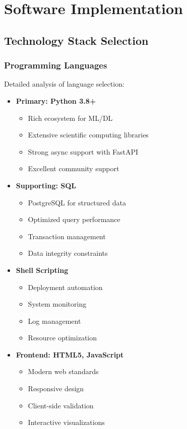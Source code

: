 \documentclass[12pt,a4paper]{report}
\begin{document}
\section{Software Implementation}
\subsection{Technology Stack Selection}
\subsubsection{Programming Languages}
Detailed analysis of language selection:

\begin{itemize}
    \item \textbf{Primary: Python 3.8+}
    \begin{itemize}
        \item Rich ecosystem for ML/DL
        \item Extensive scientific computing libraries
        \item Strong async support with FastAPI
        \item Excellent community support
    \end{itemize}
    
    \item \textbf{Supporting: SQL}
    \begin{itemize}
        \item PostgreSQL for structured data
        \item Optimized query performance
        \item Transaction management
        \item Data integrity constraints
    \end{itemize}
    
    \item \textbf{Shell Scripting}
    \begin{itemize}
        \item Deployment automation
        \item System monitoring
        \item Log management
        \item Resource optimization
    \end{itemize}
    
    \item \textbf{Frontend: HTML5, JavaScript}
    \begin{itemize}
        \item Modern web standards
        \item Responsive design
        \item Client-side validation
        \item Interactive visualizations
    \end{itemize}
\end{itemize}
\end{document}
